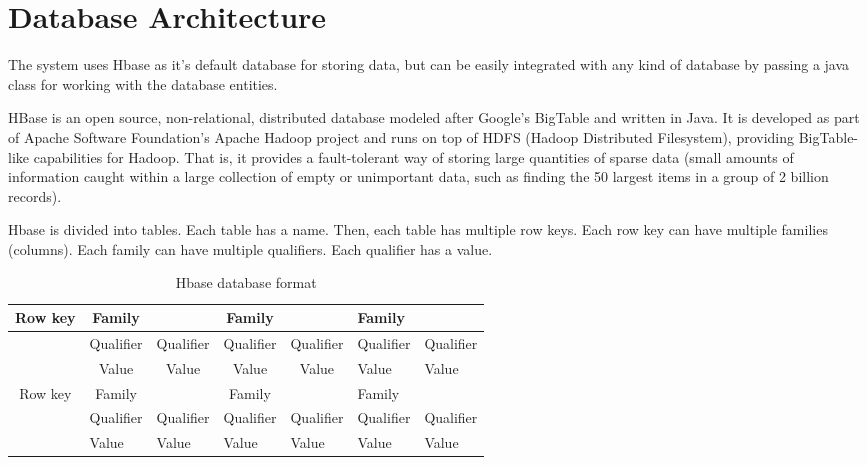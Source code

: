 \chapter{Database Architecture}
\label{chapter:database-architecture}
The system uses Hbase as it’s default database for storing data, but can be easily integrated with any kind of database by passing a java class for working with the database entities.

HBase is an open source, non-relational, distributed database modeled after Google's BigTable and written in Java. It is developed as part of Apache Software Foundation's Apache Hadoop project and runs on top of HDFS (Hadoop Distributed Filesystem), providing BigTable-like capabilities for Hadoop. That is, it provides a fault-tolerant way of storing large quantities of sparse data (small amounts of information caught within a large collection of empty or unimportant data, such as finding the 50 largest items in a group of 2 billion records).

Hbase is divided into tables. Each table has a name. Then, each table has multiple row keys. Each row key can have multiple families (columns). Each family can have multiple qualifiers. Each qualifier has a value.

\begin{table}[h]
  \caption{Hbase database format}
\centering
\begin{tabular}{@{}|c|c|c|c|c|l|l|@{}}
\toprule
Row key                & Family                         &                                & Family                         &                                & Family    &           \\ \midrule
                       & Qualifier                      & Qualifier                      & Qualifier                      & Qualifier                      & Qualifier & Qualifier \\ \midrule
                       & Value                          & Value                          & Value                          & Value                          & Value     & Value     \\ \midrule
Row key                & Family                         &                                & Family                         &                                & Family    &           \\ \midrule
\multicolumn{1}{|l|}{} & \multicolumn{1}{l|}{Qualifier} & \multicolumn{1}{l|}{Qualifier} & \multicolumn{1}{l|}{Qualifier} & \multicolumn{1}{l|}{Qualifier} & Qualifier & Qualifier \\ \midrule
\multicolumn{1}{|l|}{} & \multicolumn{1}{l|}{Value}     & \multicolumn{1}{l|}{Value}     & \multicolumn{1}{l|}{Value}     & \multicolumn{1}{l|}{Value}     & Value     & Value     \\ \bottomrule
\end{tabular}
\end{table}

